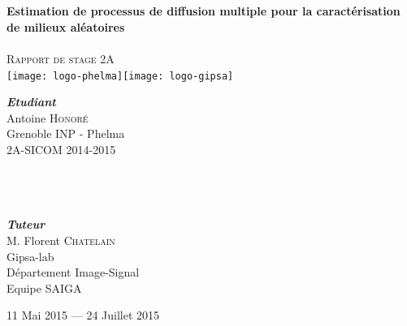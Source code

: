 \begin{titlepage}
  \begin{sffamily}
    \begin{center}

      \textsc{ }\\[1.5cm]

      \HRule \\[0.4cm]
      { \Huge \bfseries Estimation de processus de diffusion multiple pour la caractérisation de milieux aléatoires\\[0.4cm] }
      \HRule \\[2.5cm]
      \textsc{\LARGE Rapport de stage 2A}~\\[4.5cm]
      \texttt{[image: logo-phelma]}\hfill\texttt{[image: logo-gipsa]}~\\[1.5cm]


      \begin{minipage}{0.4\textwidth}
        \begin{flushleft} \large
          \emph{\textbf{Etudiant}}\\
          Antoine \textsc{Honoré}\\
          Grenoble INP - Phelma\\
          2A-SICOM 2014-2015\\
          ~\\~\\~\\
        \end{flushleft}
      \end{minipage}
      \hfill
      \begin{minipage}{0.4\textwidth}
        \begin{flushright} \large
          \emph{\textbf{Tuteur}}\\
          M. Florent \textsc{Chatelain}\\
          Gipsa-lab\\
          Département Image-Signal\\
          Equipe SAIGA\\
        \end{flushright}
      \end{minipage}

      \vfill

      {\large 11 Mai 2015 — 24 Juillet 2015}

    \end{center}
  \end{sffamily}

\end{titlepage}


